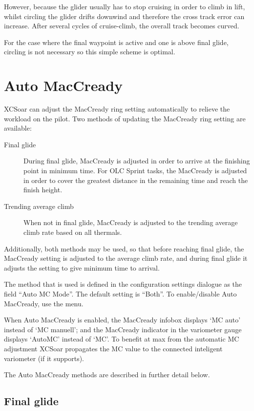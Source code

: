 However, because the glider usually has to stop cruising in order to
climb in lift, whilst circling the glider drifts downwind and
therefore the cross track error can increase.  After several cycles of
cruise-climb, the overall track becomes curved.
%

For the case where the final waypoint is active and one is above final
glide, circling is not necessary so this simple scheme is optimal.


\section{Auto MacCready}\label{sec:auto-maccready}

XCSoar can adjust the MacCready ring setting automatically to relieve the
workload on the pilot.  Two methods of updating the MacCready ring setting
are available:
\begin{description}
\item[Final glide]  During final glide, MacCready is adjusted in order to
 arrive at the finishing point in minimum time.  For OLC Sprint tasks,
 the MacCready is adjusted in order to cover the greatest distance in the remaining
 time and reach the finish height.
\item[Trending average climb] When not in final glide, MacCready is adjusted
to the trending average climb rate based on all thermals.
\end{description}
Additionally, both methods may be used, so that before reaching final glide,
the MacCready setting is adjusted to the average climb rate, and during final
glide it adjusts the setting to give minimum time to arrival.

The method that is used is defined in the configuration settings dialogue as the
field ``Auto MC Mode''.  The default setting is ``Both''.
To enable/disable Auto MacCready, use the menu.

When Auto MacCready is enabled, the MacCready infobox displays `MC auto'
instead of `MC manuell'; and the MacCready indicator in the variometer
gauge displays `AutoMC' instead of `MC'.
To benefit at max from the automatic MC adjustment XCSoar propagates the MC 
value to the connected inteligent variometer (if it supports). 

The Auto MacCready methods are described in further detail below.


\subsection*{Final glide}

